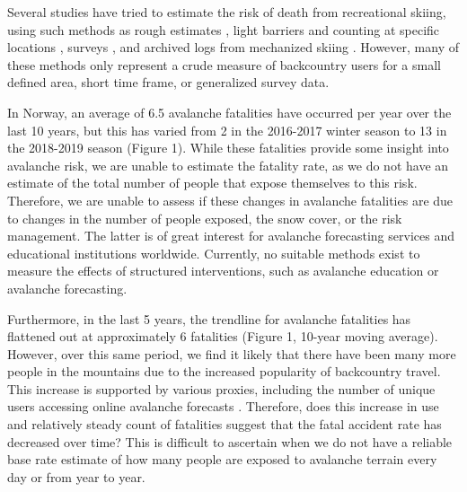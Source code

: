 \documentclass[authordate,empirical, issue]{jote-new-article}
\begin{document}
Several studies have tried to estimate the risk of death from recreational skiing, using such methods as rough estimates \parencites{Valla1984}, light barriers and counting at specific locations \parencites{Zweifel2006}, surveys \parencites{Sole2008}{Winkler2016}, and archived logs from mechanized skiing \parencites{Walcher2019}. However, many of these methods only represent a crude measure of backcountry users for a small defined area, short time frame, or generalized survey data.







In Norway, an average of 6.5 avalanche fatalities have occurred per year over the last 10 years, but this has varied from 2 in the 2016-2017 winter season to 13 in the 2018-2019 season (Figure 1). While these fatalities provide some insight into avalanche risk, we are unable to estimate the fatality rate, as we do not have an estimate of the total number of people that expose themselves to this risk. Therefore, we are unable to assess if these changes in avalanche fatalities are due to changes in the number of people exposed, the snow cover, or the risk management. The latter is of great interest for avalanche forecasting services and educational institutions worldwide. Currently, no suitable methods exist to measure the effects of structured interventions, such as avalanche education or avalanche forecasting.







Furthermore, in the last 5 years, the trendline for avalanche fatalities has flattened out at approximately 6 fatalities (Figure 1, 10-year moving average). However, over this same period, we find it likely that there have been many more people in the mountains due to the increased popularity of backcountry travel. This increase is supported by various proxies, including the number of unique users accessing online avalanche forecasts \parencites{Engeset2018}. Therefore, does this increase in use and relatively steady count of fatalities suggest that the fatal accident rate has decreased over time? This is difficult to ascertain when we do not have a reliable base rate estimate of how many people are exposed to avalanche terrain every day or from year to year.
\end{document}
